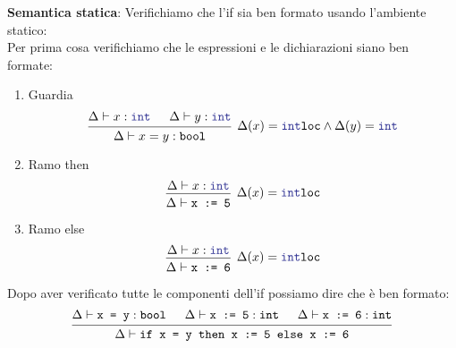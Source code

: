 \documentclass[a4paper]{article}
\begin{document}
\textbf{Semantica statica}: Verifichiamo che l'if sia ben formato usando
      l'ambiente statico:\\
      Per prima cosa verifichiamo che le espressioni e le dichiarazioni siano ben formate:
      \begin{enumerate}
        \item Guardia
          \[
            \begin{prooftree}
              \hypo{ 
                \Delta \vdash x: \texttt{\textcolor{Blue}{int}}
              }
              \hypo{ 
                \Delta \vdash y: \texttt{\textcolor{Blue}{int}}
              }
              \infer2
              [\( 
              \Delta(x) = \texttt{\textcolor{Blue}{int}loc} \land \Delta(y) =
              \texttt{\textcolor{Blue}{int}}
              \)]
              { 
                \Delta \vdash x = y: \texttt{bool}
              }
            \end{prooftree}
          \] 

        \item Ramo then
          \[
            \begin{prooftree}
              \hypo{ 
                \Delta \vdash x: \texttt{\textcolor{Blue}{int}}
              }
              \infer1
              [\( 
                \Delta(x) = \texttt{\textcolor{Blue}{int}loc}
              \)]
              { 
                \Delta \vdash \texttt{x := 5}
              }
            \end{prooftree}
          \] 

        \item Ramo else
          \[
            \begin{prooftree}
              \hypo{ 
                \Delta \vdash x: \texttt{\textcolor{Blue}{int}}
              }
              \infer1[\( 
                \Delta(x) = \texttt{\textcolor{Blue}{int}loc}
              \)]{ 
                \Delta \vdash \texttt{x := 6}
              }
            \end{prooftree}
          \] 
      \end{enumerate}
      Dopo aver verificato tutte le componenti dell'if possiamo dire che è ben
      formato:
      \[
        \begin{prooftree}
          \hypo{ 
            \Delta \vdash \texttt{x = y} : \texttt{bool}
          }
          \hypo{ 
            \Delta \vdash \texttt{x := 5}: \texttt{int}
          }
          \hypo{ 
            \Delta \vdash \texttt{x := 6}: \texttt{int}
          }
          \infer3{ 
            \Delta \vdash \texttt{if x = y then x := 5 else x := 6}
          }
        \end{prooftree}
      \] 
\end{document}
